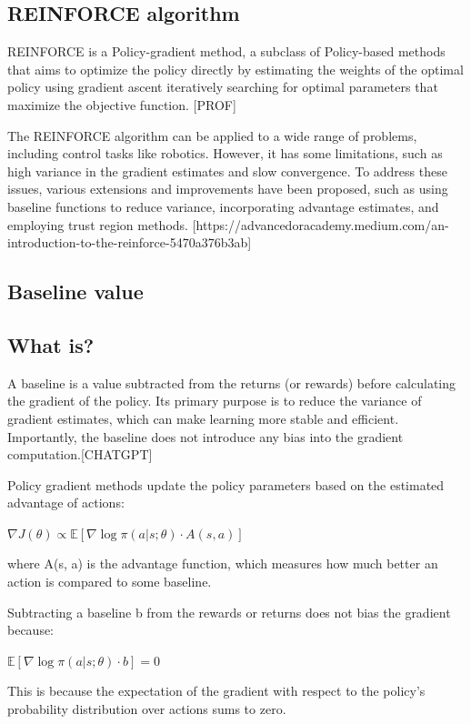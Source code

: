 \documentclass{article}
\begin{document}
\subsection{REINFORCE algorithm}
REINFORCE is a Policy-gradient method, a subclass of Policy-based methods that aims to optimize the policy directly by estimating the weights of the optimal policy using gradient ascent iteratively searching for optimal parameters that maximize the objective function. [PROF]

The REINFORCE algorithm can be applied to a wide range of problems, including control tasks like robotics. However, it has some limitations, such as high variance in the gradient estimates and slow convergence. To address these issues, various extensions and improvements have been proposed, such as using baseline functions to reduce variance, incorporating advantage estimates, and employing trust region methods. 
[https://advancedoracademy.medium.com/an-introduction-to-the-reinforce-5470a376b3ab]


\subsection{Baseline value}
\subsection{What is?}
A baseline is a value subtracted from the returns (or rewards) before calculating the gradient of the policy. Its primary purpose is to reduce the variance of gradient estimates, which can make learning more stable and efficient. Importantly, the baseline does not introduce any bias into the gradient computation.[CHATGPT]

Policy gradient methods update the policy parameters based on the estimated advantage of actions:

$\nabla J(\theta) \propto \mathbb{E}[\nabla \log \pi(a|s; \theta) \cdot A(s, a)]$

where  A(s, a)  is the advantage function, which measures how much better an action is compared to some baseline.

Subtracting a baseline  b  from the rewards or returns does not bias the gradient because:

$\mathbb{E}[\nabla \log \pi(a|s; \theta) \cdot b] = 0$

This is because the expectation of the gradient with respect to the policy’s probability distribution over actions sums to zero.\\
\end{document}
